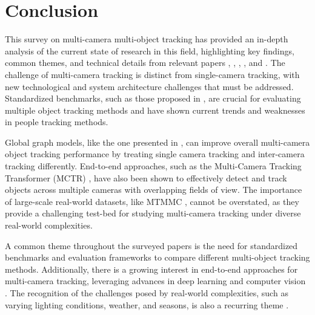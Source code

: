 \documentclass[conference]{IEEEtran}
\begin{document}
\section{Conclusion}
This survey on multi-camera multi-object tracking has provided an in-depth analysis of the current state of research in this field, highlighting key findings, common themes, and technical details from relevant papers \cite{Challenge of Multi-Camera Tracking}, \cite{Tracking the Trackers: An Analysis of the State of the Art in Multiple Object Tracking}, \cite{An equalised global graphical model-based approach for multi-camera object tracking}, \cite{MCTR: Multi Camera Tracking Transformer}, and \cite{MTMMC: A Large-Scale Real-World Multi-Modal Camera Tracking Benchmark}. The challenge of multi-camera tracking is distinct from single-camera tracking, with new technological and system architecture challenges that must be addressed. Standardized benchmarks, such as those proposed in \cite{Tracking the Trackers: An Analysis of the State of the Art in Multiple Object Tracking}, are crucial for evaluating multiple object tracking methods and have shown current trends and weaknesses in people tracking methods.

Global graph models, like the one presented in \cite{An equalised global graphical model-based approach for multi-camera object tracking}, can improve overall multi-camera object tracking performance by treating single camera tracking and inter-camera tracking differently. End-to-end approaches, such as the Multi-Camera Tracking Transformer (MCTR) \cite{MCTR: Multi Camera Tracking Transformer}, have also been shown to effectively detect and track objects across multiple cameras with overlapping fields of view. The importance of large-scale real-world datasets, like MTMMC \cite{MTMMC: A Large-Scale Real-World Multi-Modal Camera Tracking Benchmark}, cannot be overstated, as they provide a challenging test-bed for studying multi-camera tracking under diverse real-world complexities.

A common theme throughout the surveyed papers is the need for standardized benchmarks and evaluation frameworks to compare different multi-object tracking methods. Additionally, there is a growing interest in end-to-end approaches for multi-camera tracking, leveraging advances in deep learning and computer vision \cite{MCTR: Multi Camera Tracking Transformer}. The recognition of the challenges posed by real-world complexities, such as varying lighting conditions, weather, and seasons, is also a recurring theme \cite{MTMMC: A Large-Scale Real-World Multi-Modal Camera Tracking Benchmark}.
\end{document}
